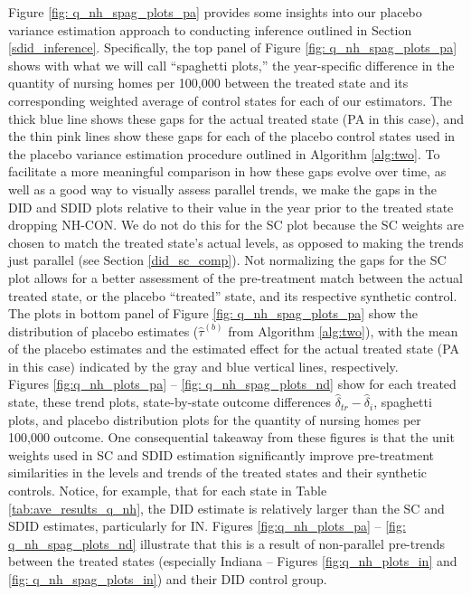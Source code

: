 \documentclass[../Main.tex]{subfiles}
\begin{document}
\indent Figure \ref{fig: q_nh_spag_plots_pa} provides some insights into our placebo variance estimation approach to conducting inference outlined in Section \ref{sdid_inference}. Specifically, the top panel of Figure \ref{fig: q_nh_spag_plots_pa} shows with what we will call ``spaghetti plots,'' the year-specific difference in the quantity of nursing homes per 100,000 between the treated state and its corresponding weighted average of control states for each of our estimators. The thick blue line shows these gaps for the actual treated state (PA in this case), and the thin pink lines show these gaps for each of the placebo control states used in the placebo variance estimation procedure outlined in Algorithm \ref{alg:two}. To facilitate a more meaningful comparison in how these gaps evolve over time, as well as a good way to visually assess parallel trends, we make the gaps in the DID and SDID plots relative to their value in the year prior to the treated state dropping NH-CON. We do not do this for the SC plot because the SC weights are chosen to match the treated state's actual levels, as opposed to making the trends just parallel (see Section \ref{did_sc_comp}). Not normalizing the gaps for the SC plot allows for a better assessment of the pre-treatment match between the actual treated state, or the placebo ``treated'' state, and its respective synthetic control. The plots in bottom panel of Figure \ref{fig: q_nh_spag_plots_pa} show the distribution of placebo estimates ($\hat{\tau}^{(b)}$ from Algorithm \ref{alg:two}), with the mean of the placebo estimates and the estimated effect for the actual treated state (PA in this case) indicated by the gray and blue vertical lines, respectively.\\  
\indent Figures \ref{fig:q_nh_plots_pa} -- \ref{fig: q_nh_spag_plots_nd} show for each treated state, these trend plots, state-by-state outcome differences $\hat{\delta}_{tr}-\hat{\delta}_i$, spaghetti plots, and placebo distribution plots for the quantity of nursing homes per 100,000 outcome. One consequential takeaway from these figures is that the unit weights used in SC and SDID estimation significantly improve pre-treatment similarities in the levels and trends of the treated states and their synthetic controls. Notice, for example, that for each state in Table \ref{tab:ave_results_q_nh}, the DID estimate is relatively larger than the SC and SDID estimates, particularly for IN. Figures \ref{fig:q_nh_plots_pa} -- \ref{fig: q_nh_spag_plots_nd} illustrate that this is a result of non-parallel pre-trends between the treated states (especially Indiana -- Figures \ref{fig:q_nh_plots_in} and \ref{fig: q_nh_spag_plots_in}) and their DID control group.\\
\end{document}
